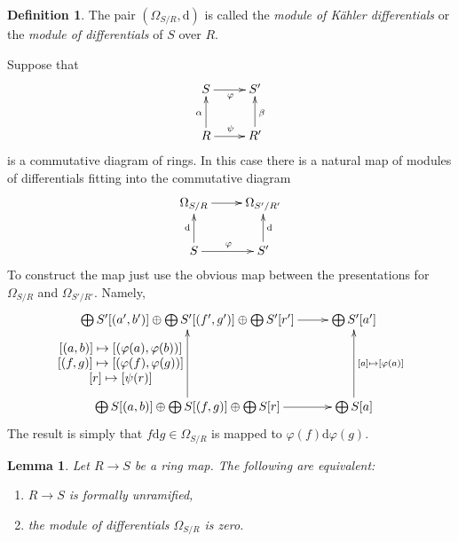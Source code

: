 \documentclass{amsart}
\theoremstyle{plain}
\newtheorem{lemma}[subsection]{Lemma}
\theoremstyle{definition}
\newtheorem{definition}[subsection]{Definition}
\theoremstyle{remark}
\numberwithin{equation}{subsection}
\begin{document}
\begin{definition}
\label{definition-differentials}
The pair $(\Omega_{S/R}, \text{d})$ is called the {\it module
of K\"ahler differentials} or the {\it module of differentials}
of $S$ over $R$.
\end{definition}

\noindent
Suppose that
\begin{equation}
\label{equation-functorial-omega}
\vcenter{
\xymatrix{
S \ar[r]_\varphi
&
S'
\\
R \ar[r]^\psi \ar[u]^\alpha
&
R' \ar[u]_\beta
}
}
\end{equation}
is a commutative diagram of rings. In this case there is a
natural map of modules of differentials fitting into the
commutative diagram
$$
\xymatrix{
\Omega_{S/R} \ar[r] &
\Omega_{S'/R'}
\\
S \ar[u]^{\text{d}} \ar[r]^{\varphi}
&
S' \ar[u]_{\text{d}}
}
$$
To construct the map just use the obvious map
between the presentations for $\Omega_{S/R}$ and $\Omega_{S'/R'}$.
Namely,
\begin{equation}
\label{equation-map-presentations}
\vcenter{
\xymatrix{
\bigoplus S'[(a', b')]
\oplus
\bigoplus S'[(f', g')]
\oplus
\bigoplus S'[r'] \ar[r]
&
\bigoplus S' [a'] \\
 \\
\bigoplus S[(a, b)]
\oplus
\bigoplus S[(f, g)]
\oplus
\bigoplus S[r] \ar[r]
\ar[uu]^{
\begin{matrix}
[(a, b)] \mapsto [(\varphi(a), \varphi(b))] \\
[(f, g)] \mapsto [(\varphi(f), \varphi(g))] \\
[r]\mapsto [\psi(r)]
\end{matrix}
} &
\bigoplus S[a] \ar[uu]_{[a] \mapsto [\varphi(a)]}
}
}
\end{equation}
The result is simply that $f\text{d}g \in \Omega_{S/R}$ is
mapped to $\varphi(f)\text{d}\varphi(g)$.

\begin{lemma}
\label{lemma-characterize-formally-unramified}
Let $R \to S$ be a ring map.
The following are equivalent:
\begin{enumerate}
\item $R \to S$ is formally unramified,
\item the module of differentials $\Omega_{S/R}$ is zero.
\end{enumerate}
\end{lemma}
\end{document}
